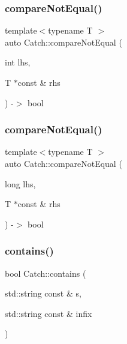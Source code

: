 \mbox{\label{namespace_catch_adb4b3e912b89a987025ca28cf0c92ba8}} 
\subsubsection{\texorpdfstring{compareNotEqual()}{compareNotEqual()}\hspace{0.1cm}{\footnotesize\ttfamily [4/5]}}
{\footnotesize\ttfamily template$<$typename T $>$ \\
auto Catch\+::compare\+Not\+Equal (\begin{DoxyParamCaption}\item[{int}]{lhs,  }\item[{T $\ast$const \&}]{rhs }\end{DoxyParamCaption}) -\/$>$ bool }

\mbox{\label{namespace_catch_a3db634a0adf44a1148767ba149ccf34d}} 
\subsubsection{\texorpdfstring{compareNotEqual()}{compareNotEqual()}\hspace{0.1cm}{\footnotesize\ttfamily [5/5]}}
{\footnotesize\ttfamily template$<$typename T $>$ \\
auto Catch\+::compare\+Not\+Equal (\begin{DoxyParamCaption}\item[{long}]{lhs,  }\item[{T $\ast$const \&}]{rhs }\end{DoxyParamCaption}) -\/$>$ bool }

\mbox{\label{namespace_catch_aa52974b0e426e7e2fbd725a900e9c36e}} 
\subsubsection{\texorpdfstring{contains()}{contains()}}
{\footnotesize\ttfamily bool Catch\+::contains (\begin{DoxyParamCaption}\item[{std\+::string const \&}]{s,  }\item[{std\+::string const \&}]{infix }\end{DoxyParamCaption})}


